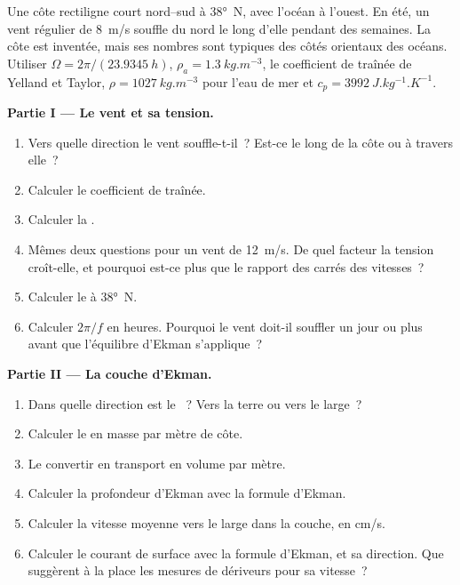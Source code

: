 \begin{problem}
\label{pb:b1:ocean-circulation:1}
Une côte rectiligne court nord--sud à \ang{38}~N, avec l'océan à l'ouest. En
été, un vent régulier de \qty{8}{m/s} souffle du nord le long d'elle pendant des semaines. La
côte est inventée, mais ses nombres sont typiques des côtés orientaux des océans.
Utiliser $\Omega = 2\pi/(\qty{23.9345}{h})$, $\rho_a = \qty{1.3}{kg.m^{-3}}$, le coefficient de
traînée de Yelland et Taylor, $\rho = \qty{1027}{kg.m^{-3}}$ pour l'eau de mer et
$c_p = \qty{3992}{J.kg^{-1}.K^{-1}}$.

\medskip
\noindent\textbf{Partie I --- Le vent et sa tension.}
\begin{enumerate}
  \item Vers quelle direction le vent souffle-t-il~? Est-ce le long de la côte ou à travers
        elle~?
  \item Calculer le coefficient de traînée.
  \item Calculer la .
  \item Mêmes deux questions pour un vent de \qty{12}{m/s}. De quel facteur
        la tension croît-elle, et pourquoi est-ce plus que le rapport des carrés des vitesses~?
  \item Calculer le  à \ang{38}~N.
  \item Calculer $2\pi/f$ en heures. Pourquoi le vent doit-il souffler un jour ou plus avant que
        l'équilibre d'Ekman s'applique~?
\end{enumerate}

\medskip
\noindent\textbf{Partie II --- La couche d'Ekman.}
\begin{enumerate}[resume]
  \item Dans quelle direction est le ~? Vers la terre ou vers le large~?
  \item Calculer le  en masse par mètre de côte.
  \item Le convertir en transport en volume par mètre.
  \item Calculer la profondeur d'Ekman avec la formule d'Ekman.
  \item Calculer la vitesse moyenne vers le large dans la couche, en \unit{cm/s}.
  \item Calculer le courant de surface avec la formule d'Ekman, et sa direction. Que
        suggèrent à la place les mesures de dériveurs pour sa vitesse~?
\end{enumerate}


\end{problem}
